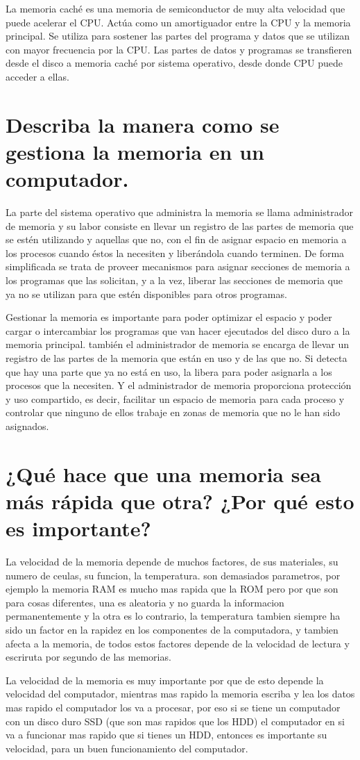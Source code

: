 \documentclass[a4paper]{article}
\begin{document}
La memoria caché es una memoria de semiconductor de muy alta velocidad que puede acelerar el CPU. Actúa como un amortiguador entre la CPU y la memoria principal. Se utiliza para sostener las partes del programa y datos que se utilizan con mayor frecuencia por la CPU. Las partes de datos y programas se transfieren desde el disco a memoria caché por sistema operativo, desde donde CPU puede acceder a ellas.

\section{Describa la manera como se gestiona la memoria en un computador.}

La parte del sistema operativo que administra la memoria se llama administrador de memoria y su labor consiste en llevar un registro de las partes de memoria que se estén utilizando y aquellas que no, con el fin de asignar espacio en memoria a los procesos cuando éstos la necesiten y liberándola cuando terminen. De forma simplificada se trata de proveer mecanismos para asignar secciones de memoria a los programas que las solicitan, y a la vez, liberar las secciones de memoria que ya no se utilizan para que estén disponibles para otros programas.

Gestionar la memoria es importante para poder optimizar el espacio y poder cargar o intercambiar los programas que van hacer ejecutados del disco duro a la memoria principal. también el administrador de memoria se encarga de llevar un registro de las partes de la memoria que están en uso y de las que no. Si detecta que hay una parte que ya no está en uso, la libera para poder asignarla a los procesos que la necesiten. Y el administrador de memoria proporciona  protección y uso compartido, es decir, facilitar un espacio de memoria para cada proceso y controlar que ninguno de ellos trabaje en zonas de memoria que no le han sido asignados.

\section{¿Qué hace que una memoria sea más rápida que otra? ¿Por qué esto es importante?}

La velocidad de la memoria depende de muchos factores, de sus materiales, su numero de ceulas, su funcion, la temperatura. son demasiados parametros, por ejemplo la memoria RAM es mucho mas rapida que la ROM pero por que son para cosas diferentes, una es aleatoria y no guarda la informacion permanentemente y la otra es lo contrario, la temperatura tambien siempre ha sido un factor en la rapidez en los componentes de la computadora, y tambien afecta a la memoria, de todos estos factores depende de la velocidad de lectura y escriruta por segundo de las memorias.

La velocidad de la memoria es muy importante por que de esto depende la velocidad del computador, mientras mas rapido la memoria escriba y lea los datos mas rapido el computador los va a procesar, por eso si se tiene un computador con un disco duro SSD (que son mas rapidos que los HDD) el computador en si va a funcionar mas rapido que si tienes un HDD, entonces es importante su velocidad, para un buen funcionamiento del computador.
\end{document}
